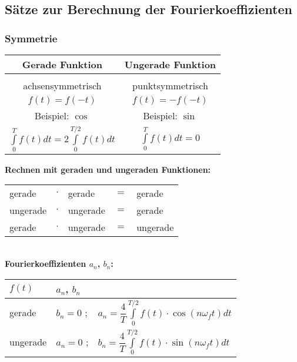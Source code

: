 	\subsection{Sätze zur Berechnung der Fourierkoeffizienten}
		\subsubsection{Symmetrie}
			\begin{minipage}[]{0.5\textwidth}
				\begin{tabular}{|c|c|}
					\hline
					\textbf{Gerade Funktion} & \textbf{Ungerade Funktion}\\[3pt]
					\hline
					\scalebox{0.45}{} & \scalebox{0.45}{}\\[3pt]
					\hline
					achsensymmetrisch & punktsymmetrisch\\[3pt]
					$\displaystyle f(t) = f(-t)$ & $f(t) = -f(-t)$\\[3pt]
					\hline
					Beispiel: $\displaystyle \cos$ & Beispiel: $\sin$\\[3pt]
					\hline
					$\displaystyle \int\limits_{0}^{T} f(t) dt = 2 \int\limits_{0}^{T/2} f(t) dt$ & $\displaystyle \int\limits_{0}^{T} f(t) dt = 0$\\[3pt]
					\hline
				\end{tabular}
			\end{minipage}
			\begin{minipage}[]{0.5\textwidth}
				\textbf{Rechnen mit geraden und ungeraden Funktionen:}\\[3pt]
				\begin{tabular}{|lclcl|}
					\hline
					gerade & $\cdot$ & gerade & $=$ & gerade\\[3pt]
					ungerade & $\cdot$ & ungerade & $=$ & gerade\\[3pt]
					gerade & $\cdot$ & ungerade & $=$ & ungerade\\[3pt]
					\hline
				\end{tabular}\\[3pt]
				\textbf{Fourierkoeffizienten $a_n$, $b_n$:}\\[3pt]
				\begin{tabular}{|l|ll|}
					\hline
					$f(t)$		&  $a_n$, $b_n$ & \\[3pt]
					\hline
					gerade		& $b_n = 0$ ; & $\displaystyle a_n = \dfrac{4}{T} \int\limits_{0}^{T/2} f(t) \cdot \cos(n \omega_f t) dt$\\[3pt]
					\hline
					ungerade	& $a_n = 0$ ; & $\displaystyle b_n = \dfrac{4}{T} \int\limits_{0}^{T/2} f(t) \cdot \sin(n \omega_f t) dt$\\[3pt]
					\hline
				\end{tabular}
			\end{minipage}
